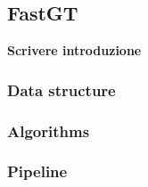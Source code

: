 \documentclass[../main.tex]{subfiles}
\begin{document}
\subsection{FastGT}

\textbf{Scrivere introduzione}

\subsubsection{Data structure}
\subsubsection{Algorithms}
\subsubsection{Pipeline}
\end{document}
